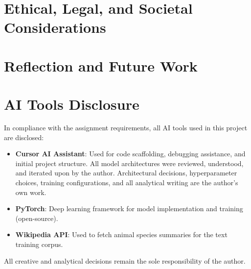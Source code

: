 \documentclass[12pt,a4paper]{article}
\begin{document}

\section{Ethical, Legal, and Societal Considerations}
\label{sec:ethics}


\section{Reflection and Future Work}
\label{sec:future}


\section{AI Tools Disclosure}
\label{sec:ai_disclosure}

In compliance with the assignment requirements, all AI tools used in this project are disclosed:

\begin{itemize}
    \item \textbf{Cursor AI Assistant}: Used for code scaffolding, debugging assistance, and initial project structure. All model architectures were reviewed, understood, and iterated upon by the author. Architectural decisions, hyperparameter choices, training configurations, and all analytical writing are the author's own work.
    \item \textbf{PyTorch}: Deep learning framework for model implementation and training (open-source).
    \item \textbf{Wikipedia API}: Used to fetch animal species summaries for the text training corpus.
\end{itemize}

All creative and analytical decisions remain the sole responsibility of the author.



\end{document}
